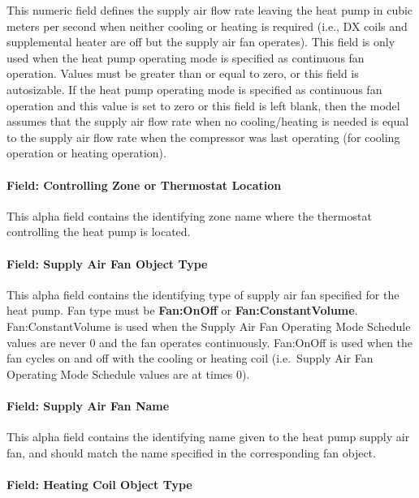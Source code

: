This numeric field defines the supply air flow rate leaving the heat pump in cubic meters per second when neither cooling or heating is required (i.e., DX coils and supplemental heater are off but the supply air fan operates). This field is only used when the heat pump operating mode is specified as continuous fan operation. Values must be greater than or equal to zero, or this field is autosizable. If the heat pump operating mode is specified as continuous fan operation and this value is set to zero or this field is left blank, then the model assumes that the supply air flow rate when no cooling/heating is needed is equal to the supply air flow rate when the compressor was last operating (for cooling operation or heating operation).

\paragraph{Field: Controlling Zone or Thermostat Location}\label{field-controlling-zone-or-thermostat-location-3}

This alpha field contains the identifying zone name where the thermostat controlling the heat pump is located.

\paragraph{Field: Supply Air Fan Object Type}\label{field-supply-air-fan-object-type}

This alpha field contains the identifying type of supply air fan specified for the heat pump. Fan type must be \textbf{Fan:OnOff} or \textbf{Fan:ConstantVolume}. Fan:ConstantVolume is used when the Supply Air Fan Operating Mode Schedule values are never 0 and the fan operates continuously. Fan:OnOff is used when the fan cycles on and off with the cooling or heating coil (i.e.~Supply Air Fan Operating Mode Schedule values are at times 0).

\paragraph{Field: Supply Air Fan Name}\label{field-supply-air-fan-name}

This alpha field contains the identifying name given to the heat pump supply air fan, and should match the name specified in the corresponding fan object.

\paragraph{Field: Heating Coil Object Type}\label{field-heating-coil-object-type-3}


